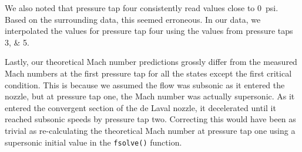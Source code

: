 We also noted that pressure tap four consistently read values close to \qty{0}{psi}. Based on the surrounding data, this seemed erroneous. In our data, we interpolated the values for pressure tap four using the values from pressure taps \numlist{3;5}.

Lastly, our theoretical Mach number predictions grossly differ from the measured Mach numbers at the first pressure tap for all the states except the first critical condition. This is because we assumed the flow was subsonic as it entered the nozzle, but at pressure tap one, the Mach number was actually supersonic. As it entered the convergent section of the de Laval nozzle, it decelerated until it reached subsonic speeds by pressure tap two. Correcting this would have been as trivial as re-calculating the theoretical Mach number at pressure tap one using a supersonic initial value in the \verb|fsolve()| function.
  